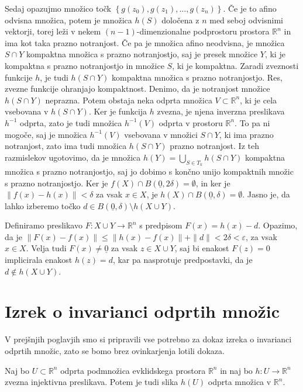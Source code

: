 \documentclass[mat1]{fmfdelo}
\newcommand{\R}{\mathbb R}
\newcommand{\0}{\underline{0}}
\begin{document}
\begin{dokaz}
Sedaj opazujmo množico točk $\left \{ g(z_0), g(z_1), \dots, g(z_n) \right \}$. Če je to afino odvisna množica, potem je množica $h(S)$ določena z $n$ med seboj odvisnimi vektorji, torej leži v nekem $(n-1)$-dimenzionalne podprostoru prostora $\R^n$ in ima kot taka prazno notranjost. Če pa je množica afino neodvisna, je množica $S \cap Y$ kompaktna množica s prazno notranjostjo, saj je presek množice $Y$, ki je kompaktna s prazno notranjostjo in množice $S$, ki je kompaktna. Zaradi zveznosti funkcije $h$, je tudi $h(S \cap Y)$ kompaktna množica s prazno notranjostjo. Res, zvezne funkcije ohranjajo kompaktnost. Denimo, da je notranjost množice $h(S \cap Y)$ neprazna. Potem obstaja neka odprta množica $V \subset \R^n$, ki je cela vsebovana v $h(S \cap Y)$. Ker je funkcija $h$ zvezna, je njena inverzna preslikava $h^{-1}$ odprta, zato je tudi množica $h^{-1}(V)$ odprta v prostoru $\R^n$. To pa ni mogoče, saj je množica $h^{-1}(V)$ vsebovana v množici $S \cap Y$, ki ima prazno notranjost, zato ima tudi množica $h(S \cap Y)$ prazno notranjost. Iz teh razmislekov ugotovimo, da je množica $h(Y) = \bigcup\limits_{S \in T_k} h(S \cap Y)$ kompaktna množica s prazno notranjostjo, saj jo dobimo s končno unijo kompaktnih množic s prazno notranjostjo. Ker je $f(X) \cap B(\0, 2 \delta) = \emptyset$, in ker je $\| f(x) - h(x) \| < \delta$ za vsak $x \in X$, je $h(X) \cap B(\0, \delta) = \emptyset$. Jasno je, da lahko izberemo točko $d \in B(\0, \delta) \setminus h(X \cup Y)$.

Definiramo preslikavo $F : X \cup Y \to \R^n$ s predpisom $F(x)  = h(x) - d$. Opazimo, da je $\| F(x) - f(x) \| \leq \| h(x) - f(x) \| + \| d \| < 2\delta < \varepsilon$, za vsak $x \in X$. Velja tudi $F(x) \neq \0$ za vsak $z \in X \cup Y$, saj bi enakost $F(z) = 0$ implicirala enakost $h(z) = d$, kar pa nasprotuje predpostavki, da je $d \notin h(X \cup Y)$.
\end{dokaz}


\section{Izrek o invarianci odprtih množic}\label{raz:ioiom}
V prejšnjih poglavjih smo si pripravili vse potrebno za dokaz izreka o invarianci odprtih množic, zato se bomo brez ovinkarjenja lotili dokaza.

\begin{izrek}\label{izr:main-theorem}
Naj bo $U \subset \R^n$ odprta podmnožica evklidskega prostora $\R^n$ in naj bo $h : U \rightarrow \R^n$ zvezna injektivna preslikava.
Potem je tudi slika $h(U)$ odprta množica v $\R^n$.
\end{izrek}
\end{document}

